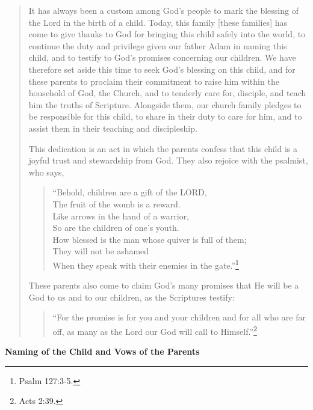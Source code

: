 \documentclass[
]{book}
\begin{document}
\begin{quote}
It has always been a custom among God's people to mark the blessing of the Lord in the birth of a child. Today, this family {[}these families{]} has come to give thanks to God for bringing this child safely into the world, to continue the duty and privilege given our father Adam in naming this child, and to testify to God's promises concerning our children. We have therefore set aside this time to seek God's blessing on this child, and for these parents to proclaim their commitment to raise him within the household of God, the Church, and to tenderly care for, disciple, and teach him the truths of Scripture. Alongside them, our church family pledges to be responsible for this child, to share in their duty to care for him, and to assist them in their teaching and discipleship.

This dedication is an act in which the parents confess that this child is a joyful trust and stewardship from God. They also rejoice with the psalmist, who says,

\begin{quote}
``Behold, children are a gift of the LORD,\\
The fruit of the womb is a reward.\\
Like arrows in the hand of a warrior,\\
So are the children of one's youth.\\
How blessed is the man whose quiver is full of them;\\
They will not be ashamed\\
When they speak with their enemies in the gate.''\footnote{Psalm 127:3-5.}
\end{quote}

These parents also come to claim God's many promises that He will be a God to us and to our children, as the Scriptures testify:

\begin{quote}
``For the promise is for you and your children and for all who are far off, as many as the Lord our God will call to Himself.''\footnote{Acts 2:39.}
\end{quote}
\end{quote}

\textbf{Naming of the Child and Vows of the Parents}
\end{document}
